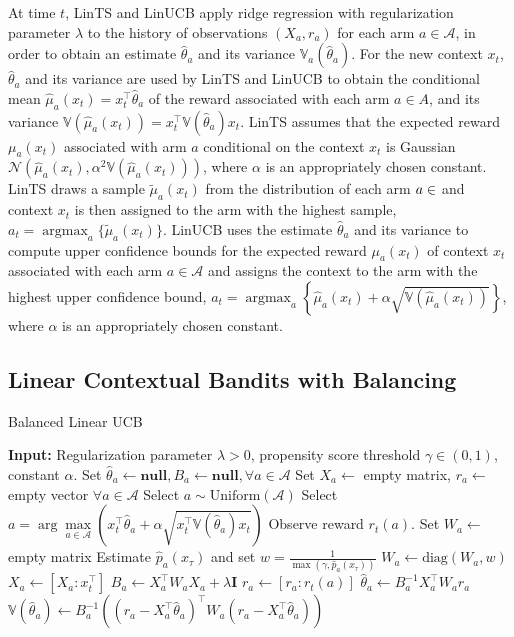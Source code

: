 \documentclass[letterpaper]{article} %
\newcommand{\field}[1]{\mathbb{#1}}
\def\A{\mathcal{A}}
\def\B{B}
\def\I{\mathbf{I}}
\def\N{\mathcal{N}}
\def\V{\field{V}}
\def\V{\mathbb{V}}
\DeclareMathOperator*{\argmax}{argmax}
\begin{document}
At time $t$, LinTS and LinUCB apply ridge regression with regularization parameter $\lambda$ to the history of observations $(X_a, r_a)$ for each arm $a \in \A$, in order to obtain an estimate $\hat{\theta}_a$ and its variance $\V_a(\hat\theta_a)$.
For the new context $x_t$, $\hat{\theta}_a$ and its variance are used by LinTS and LinUCB to obtain the conditional mean $\hat{\mu}_a(x_t)=x_t^\top\hat\theta_a$  of the reward associated with each arm $a \in A$, and its  variance $\V(\hat{\mu}_a(x_t))=x^\top_t \V(\hat\theta_a) x_t $.
LinTS assumes that the expected reward $\mu_a(x_t)$ associated with arm $a$ conditional on the context $x_t$ is Gaussian $ \N\left(\hat{\mu}_a(x_t), \alpha^2\V(\hat{\mu}_a(x_t)) \right)$, where $\alpha$ is an appropriately chosen constant.
LinTS draws a sample $\tilde{\mu}_a(x_t)$ from the distribution of each arm $a \in \cal$ and context $x_t$ is then assigned to the arm with the highest sample, $a_t = \argmax_a \{\tilde{\mu}_{a}(x_t)\}$.
LinUCB uses the estimate $\hat{\theta}_a$ and its variance to compute upper confidence bounds for the expected reward $\mu_a(x_t)$ of context $x_t$ associated with each arm $a \in \A$ and assigns the context to the arm with the highest upper confidence bound, $a_t = \argmax_a\left\{\hat{\mu}_a(x_t) + \alpha \sqrt{\V(\hat{\mu}_a(x_t))}\right\}$, where $\alpha$ is an appropriately chosen constant.




\subsection{Linear Contextual Bandits with Balancing} \label{blcb}




\begin{algorithm}[t]
\caption{Balanced Linear UCB}
\label{alg:BLUCB}
\begin{algorithmic}[1]
\State \textbf{Input:} Regularization parameter $\lambda > 0$, propensity score threshold $\gamma \in (0, 1)$, constant $\alpha$.
\State Set $\hat{\theta}_a \leftarrow \textbf{null}, \B_a \leftarrow \textbf{null}, \forall a \in \mathcal{A}$
\State Set $X_a \leftarrow$ empty matrix, $r_a \leftarrow$ empty vector $\forall a \in \mathcal{A}$
\If {$\exists a \in \A \text{ s.t. }\hat{\theta}_a = \textbf{null}$ or $\B_a = \textbf{null}$}
\State Select $a \sim \text{Uniform}(\A)$
\Else
\State Select $a = \arg\max\limits_{a\in\A} \left(x_t^\top \hat{\theta}_a + \alpha \sqrt{x_t^\top  \V(\hat\theta_a) x_t}\right)$
\EndIf
\State Observe reward $r_t(a)$.
\State Set $W_a \leftarrow $ empty matrix
\State Estimate $\hat{p}_a(x_\tau)$ and set $w = \frac{1}{\max(\gamma, \hat{p}_a(x_\tau))}$
\State $W_a \leftarrow \text{diag}(W_a, w)$
\EndFor
\State $X_a \leftarrow [X_a : x_t^\top]$
\State $B_a \leftarrow X_a^\top W_a X_a + \lambda \I$
\State $r_a \leftarrow [r_a : r_t(a)]$
\State $\hat{\theta}_a \leftarrow B_a^{-1} X_a^\top W_a r_a$
\State $\V(\hat\theta_a)\leftarrow  B_a^{-1}\left((r_a-X_a^\top\hat\theta_a)^\top W_a(r_a-X_a^\top\hat\theta_a)\right) $
\EndFor
\end{algorithmic}
\end{algorithm}
\end{document}
